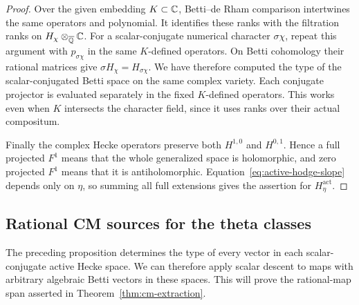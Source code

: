 \begin{proof}
Over the given embedding \(K\subset\mathbb{C}\), Betti--de Rham comparison
intertwines the same operators and polynomial. It identifies these
ranks with the filtration ranks on \(H_\chi\otimes_{\overline{\mathbb{Q}}}\mathbb{C}\).
For a scalar-conjugate numerical character \(\sigma\chi\), repeat
this argument with \(p_{\sigma\chi}\) in the same \(K\)-defined
operators. On Betti cohomology their rational matrices give
\(\sigma H_\chi=H_{\sigma\chi}\). We have therefore computed the
type of the scalar-conjugated Betti space on the same complex variety.
Each conjugate projector is evaluated separately in the fixed
\(K\)-defined operators. This works even when \(K\) intersects the
character field, since it uses ranks over their actual compositum.

Finally the complex Hecke operators preserve both \(H^{1,0}\) and
\(H^{0,1}\). Hence a full projected \(F^1\) means that the whole
generalized space is holomorphic, and zero projected \(F^1\) means
that it is antiholomorphic. Equation~\eqref{eq:active-hodge-slope}
depends only on \(\eta\), so summing all full extensions gives the
assertion for \(H^{\mathrm{act}}_\eta\).
\end{proof}

\subsection{Rational CM sources for the theta classes}\label{subsec:rational-cm-sources}

The preceding proposition determines the type of every vector in each
scalar-conjugate active Hecke space. We can therefore apply scalar
descent to maps with arbitrary algebraic Betti vectors in these spaces.
This will prove the rational-map span asserted in
Theorem~\ref{thm:cm-extraction}.

